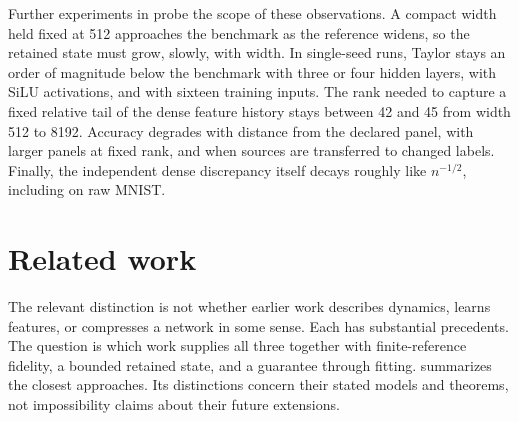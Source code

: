 \documentclass[11pt]{article}
\theoremstyle{definition}
\theoremstyle{remark}
\begin{document}
Further experiments in  probe the scope of these
observations. A compact width held fixed at 512 approaches the benchmark as
the reference widens, so the retained state must grow, slowly, with width.
In single-seed runs, Taylor stays an order of magnitude below the benchmark
with three or four hidden layers, with SiLU activations, and with sixteen
training inputs. The rank needed to capture a fixed relative tail of the
dense feature history stays between 42 and 45 from width 512 to 8192.
Accuracy degrades with distance from the declared panel, with larger panels
at fixed rank, and when sources are transferred to changed labels. Finally,
the independent dense discrepancy itself decays roughly like $n^{-1/2}$,
including on raw MNIST.

\section{Related work}
\label{cp:related}

The relevant distinction is not whether earlier work describes dynamics,
learns features, or compresses a network in some sense. Each has substantial
precedents. The question is which work supplies all three together with
finite-reference fidelity, a bounded retained state, and a guarantee through
fitting.  summarizes the closest approaches. Its
distinctions concern their stated models and theorems, not impossibility
claims about their future extensions.
\end{document}
